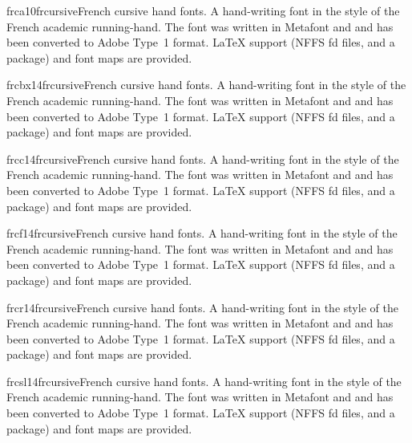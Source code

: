 \documentclass{ddltxtyp}
\begin{document}

\begin{package}{frca10}{frcursive}{French cursive hand fonts.}
A hand-writing font in the style of the French academic
running-hand. The font was written in Metafont and and has been
converted to Adobe Type~1 format. {\LaTeX} support (NFFS fd files,
and a package) and font maps are provided.
\end{package}
\begin{package}{frcbx14}{frcursive}{French cursive hand fonts.}
A hand-writing font in the style of the French academic
running-hand. The font was written in Metafont and and has been
converted to Adobe Type~1 format. {\LaTeX} support (NFFS fd files,
and a package) and font maps are provided.
\end{package}
\begin{package}{frcc14}{frcursive}{French cursive hand fonts.}
A hand-writing font in the style of the French academic
running-hand. The font was written in Metafont and and has been
converted to Adobe Type~1 format. {\LaTeX} support (NFFS fd files,
and a package) and font maps are provided.
\end{package}
\begin{package}{frcf14}{frcursive}{French cursive hand fonts.}
A hand-writing font in the style of the French academic
running-hand. The font was written in Metafont and and has been
converted to Adobe Type~1 format. {\LaTeX} support (NFFS fd files,
and a package) and font maps are provided.
\end{package}
\begin{package}{frcr14}{frcursive}{French cursive hand fonts.}
A hand-writing font in the style of the French academic
running-hand. The font was written in Metafont and and has been
converted to Adobe Type~1 format. {\LaTeX} support (NFFS fd files,
and a package) and font maps are provided.
\end{package}
\begin{package}{frcsl14}{frcursive}{French cursive hand fonts.}
A hand-writing font in the style of the French academic
running-hand. The font was written in Metafont and and has been
converted to Adobe Type~1 format. {\LaTeX} support (NFFS fd files,
and a package) and font maps are provided.
\end{package}
\end{document}
